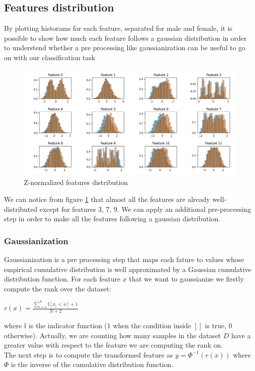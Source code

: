 \documentclass[10pt, a4paper, twocolumn]{article} %
\begin{document}
\subsection{Features distribution}
By plotting historams for each feature, separated for male and female, it is possible to show
how much each feature follows a gaussian distribution in order to understend whether a pre processing
like gaussianization can be useful to go on with our classification task
\begin{figure}[ht!]
	\includegraphics[width=\linewidth]{./Pictures/FeaturesAnalysis/hist_znorm.png}
	\caption{Z-normalized features distribution}
	\label{hist_znorm} 
\end{figure}

We can notice from figure \ref{hist_znorm} that almost all the features are already 
well-distributed except for features 3, 7, 9. We can apply an additional pre-processing step in
order to make all the features following a gaussian distribution.

\subsubsection{Gaussianization}
Gaussianization is a pre processing step that maps each fature to values whose empirical cumulative
distribution is well approximated by a Gaussian cumulative distribution function. For each
feature $x$ that we want to gaussianize we firstly compute the rank over the dataset:\\
\begin{center}
	\begin{math}
		r(x) = \frac{\sum_{i=1}^{N}\mathbb{I}[x_{i} < x] + 1}{N + 2}
	\end{math}
\end{center}
where $\mathbb{I}$ is the indicator function ($1$ when the condition inside $[ ]$ is true, $0$ 
otherwise). Actually, we are counting how many samples in the dataset $D$ have a greater value
with respect to the feature we are computing the rank on. \\
The next step is to compute the transformed feature as $y = \Phi^{-1}(r(x))$ where $\Phi$ is
the inverse of the cumulative distribution function. 
\end{document}
